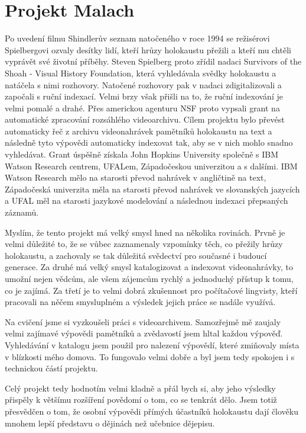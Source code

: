 \documentclass[12pt,a4paper]{report}
\begin{document}
\section*{Projekt Malach}

Po uvedení filmu Shindlerův seznam natočeného v roce 1994 se režisérovi
Spielbergovi ozvaly desítky lidí, kteří hrůzy holokaustu přežili a kteří mu
chtěli vyprávět své životní příběhy. Steven Spielberg proto zřídil nadaci
Survivors of the Shoah - Visual History Foundation, která vyhledávala svědky
holokaustu a natáčela s nimi rozhovory. Natočené rozhovory pak v nadaci
zdigitalizovali a započali s ruční indexací. Velmi brzy však přišli na to, že
ruční indexování je velmi pomalé a drahé. Přes americkou agenturu NSF proto
vypsali grant na automatické zpracování rozsáhlého videoarchivu.  Cílem
projektu bylo převést automaticky řeč z archivu videonahrávek pamětníků
holokaustu na text a následně tyto výpovědi automaticky indexovat tak, aby se v
nich mohlo snadno vyhledávat.  Grant úspěšně získala John Hopkins University
společně s IBM Watson Research centrem, UFALem, Západočeskou univerzitou a s
dalšími. IBM Watson Research mělo na starosti převod nahrávek v angličtině na
text, Západočeská univerzita měla na starosti převod nahrávek ve slovanských
jazycích a UFAL měl na starosti jazykové modelování a následnou indexaci
přepsaných záznamů.

Myslím, že tento projekt má velký smysl hned na několika rovinách. Prvně je
velmi důležité to, že se vůbec zaznamenaly vzpomínky těch, co přežily hrůzy
holokaustu, a zachovaly se tak důležitá svědectví pro současné i budoucí
generace. Za druhé má velký smysl katalogizovat a indexovat videonahrávky, to
umožní nejen vědcům, ale všem zájemcům rychlý a jednoduchý přístup k tomu, co
je zajímá. Za třetí je to velmi dobrá zkušennost pro počítačové lingvisty,
kteří pracovali na něčem smysluplném a výsledek jejich práce se nadále využívá.

Na cvičení jsme si vyzkoušeli práci s videoarchivem. Samozřejmě mě zaujaly
velmi zajímavé výpovědi pamětníků a zvědavostí jsem hltal každou výpověď.
Vyhledávání v katalogu jsem použil pro nalezení výpovědí, které zmiňovaly místa
v blízkosti mého domova. To fungovalo velmi dobře a byl jsem tedy spokojen i s
technickou částí projektu. 

Celý projekt tedy hodnotím velmi kladně a přál bych si, aby jeho výsledky
přispěly k většímu rozšíření povědomí o tom, co se tenkrát dělo. Jsem totiž
přesvědčen o tom, že osobní výpovědi přímých účastníků holokaustu dají člověku
mnohem lepší představu o dějinách než učebnice dějepisu.
\end{document}
